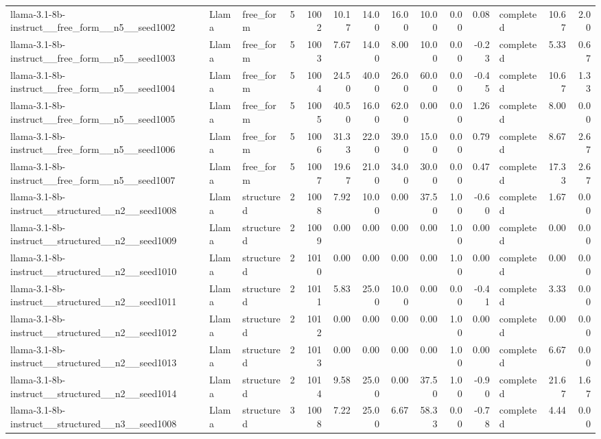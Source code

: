 \begin{longtable}{lllrrrrrrrrlrr}
llama-3.1-8b-instruct\_\_free\_form\_\_n5\_\_seed1002 & Llama & free\_form & 5 & 1002 & 10.17 & 14.00 & 16.00 & 10.00 & 0.00 & 0.08 & completed & 10.67 & 2.00 \\
llama-3.1-8b-instruct\_\_free\_form\_\_n5\_\_seed1003 & Llama & free\_form & 5 & 1003 & 7.67 & 14.00 & 8.00 & 10.00 & 0.00 & -0.23 & completed & 5.33 & 0.67 \\
llama-3.1-8b-instruct\_\_free\_form\_\_n5\_\_seed1004 & Llama & free\_form & 5 & 1004 & 24.50 & 40.00 & 26.00 & 60.00 & 0.00 & -0.45 & completed & 10.67 & 1.33 \\
llama-3.1-8b-instruct\_\_free\_form\_\_n5\_\_seed1005 & Llama & free\_form & 5 & 1005 & 40.50 & 16.00 & 62.00 & 0.00 & 0.00 & 1.26 & completed & 8.00 & 0.00 \\
llama-3.1-8b-instruct\_\_free\_form\_\_n5\_\_seed1006 & Llama & free\_form & 5 & 1006 & 31.33 & 22.00 & 39.00 & 15.00 & 0.00 & 0.79 & completed & 8.67 & 2.67 \\
llama-3.1-8b-instruct\_\_free\_form\_\_n5\_\_seed1007 & Llama & free\_form & 5 & 1007 & 19.67 & 21.00 & 34.00 & 30.00 & 0.00 & 0.47 & completed & 17.33 & 2.67 \\
llama-3.1-8b-instruct\_\_structured\_\_n2\_\_seed1008 & Llama & structured & 2 & 1008 & 7.92 & 10.00 & 0.00 & 37.50 & 1.00 & -0.60 & completed & 1.67 & 0.00 \\
llama-3.1-8b-instruct\_\_structured\_\_n2\_\_seed1009 & Llama & structured & 2 & 1009 & 0.00 & 0.00 & 0.00 & 0.00 & 1.00 & 0.00 & completed & 0.00 & 0.00 \\
llama-3.1-8b-instruct\_\_structured\_\_n2\_\_seed1010 & Llama & structured & 2 & 1010 & 0.00 & 0.00 & 0.00 & 0.00 & 1.00 & 0.00 & completed & 0.00 & 0.00 \\
llama-3.1-8b-instruct\_\_structured\_\_n2\_\_seed1011 & Llama & structured & 2 & 1011 & 5.83 & 25.00 & 10.00 & 0.00 & 0.00 & -0.41 & completed & 3.33 & 0.00 \\
llama-3.1-8b-instruct\_\_structured\_\_n2\_\_seed1012 & Llama & structured & 2 & 1012 & 0.00 & 0.00 & 0.00 & 0.00 & 1.00 & 0.00 & completed & 0.00 & 0.00 \\
llama-3.1-8b-instruct\_\_structured\_\_n2\_\_seed1013 & Llama & structured & 2 & 1013 & 0.00 & 0.00 & 0.00 & 0.00 & 1.00 & 0.00 & completed & 6.67 & 0.00 \\
llama-3.1-8b-instruct\_\_structured\_\_n2\_\_seed1014 & Llama & structured & 2 & 1014 & 9.58 & 25.00 & 0.00 & 37.50 & 1.00 & -0.90 & completed & 21.67 & 1.67 \\
llama-3.1-8b-instruct\_\_structured\_\_n3\_\_seed1008 & Llama & structured & 3 & 1008 & 7.22 & 25.00 & 6.67 & 58.33 & 0.00 & -0.78 & completed & 4.44 & 0.00 \\

\end{longtable}

